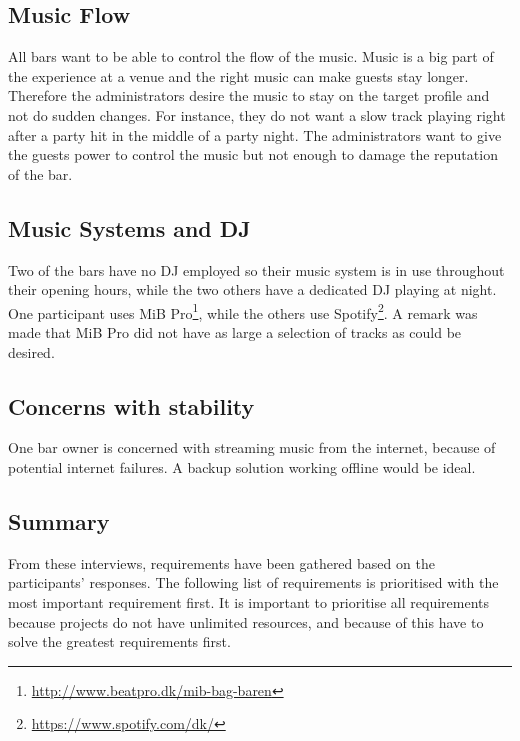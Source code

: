 \subsection{Music Flow}
\label{sub:MusicFlow}
All bars want to be able to control the flow of the music. Music is a big part of the experience at a venue and the right music can make guests stay longer. Therefore the administrators desire the music to stay on the target profile and not do sudden changes. For instance, they do not want a slow track playing right after a party hit in the middle of a party night. The administrators want to give the guests power to control the music but not enough to damage the reputation of the bar.


\subsection{Music Systems and DJ}
\label{sub:differences}
Two of the bars have no DJ employed so their music system is in use throughout their opening hours, while the two others have a dedicated DJ playing at night. One participant uses MiB Pro\footnote{\url{http://www.beatpro.dk/mib-bag-baren}}, while the others use Spotify\footnote{\url{https://www.spotify.com/dk/}}. A remark was made that MiB Pro did not have as large a selection of tracks as could be desired.

\subsection{Concerns with stability}
\label{sub:specific_remarks}

One bar owner is concerned with streaming music from the internet, because of potential internet failures. A backup solution working offline would be ideal.

\subsection{Summary}
\label{sub:summary}

From these interviews, requirements have been gathered based on the
participants' responses. The following list of requirements is
prioritised with the most important requirement first.  It is
important to prioritise all requirements because projects do not have
unlimited resources, and because of this have to solve the greatest
requirements first.

